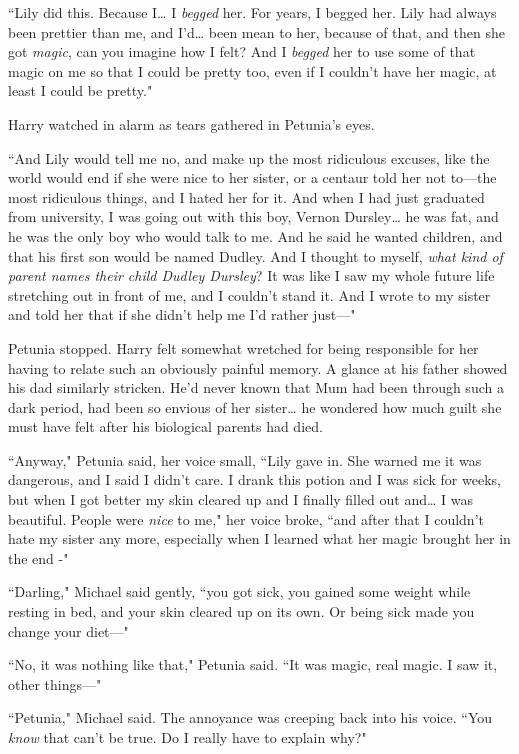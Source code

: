 ``Lily did this. Because I{\ldots} I \emph{begged} her. For years, I begged her. Lily had always been prettier than me, and I'd{\ldots} been mean to her, because of that, and then she got \emph{magic}, can you imagine how I felt? And I \emph{begged} her to use some of that magic on me so that I could be pretty too, even if I couldn't have her magic, at least I could be pretty."

Harry watched in alarm as tears gathered in Petunia's eyes.

``And Lily would tell me no, and make up the most ridiculous excuses, like the world would end if she were nice to her sister, or a centaur told her not to---the most ridiculous things, and I hated her for it. And when I had just graduated from university, I was going out with this boy, Vernon Dursley{\ldots} he was fat, and he was the only boy who would talk to me. And he said he wanted children, and that his first son would be named Dudley. And I thought to myself, \emph{what kind of parent names their child Dudley Dursley}? It was like I saw my whole future life stretching out in front of me, and I couldn't stand it. And I wrote to my sister and told her that if she didn't help me I'd rather just---"

Petunia stopped. Harry felt somewhat wretched for being responsible for her having to relate such an obviously painful memory. A glance at his father showed his dad similarly stricken. He'd never known that Mum had been through such a dark period, had been so envious of her sister{\ldots} he wondered how much guilt she must have felt after his biological parents had died.

``Anyway," Petunia said, her voice small, ``Lily gave in. She warned me it was dangerous, and I said I didn't care. I drank this potion and I was sick for weeks, but when I got better my skin cleared up and I finally filled out and{\ldots} I was beautiful. People were \emph{nice} to me," her voice broke, ``and after that I couldn't hate my sister any more, especially when I learned what her magic brought her in the end -"

``Darling," Michael said gently, ``you got sick, you gained some weight while resting in bed, and your skin cleared up on its own. Or being sick made you change your diet---"

``No, it was nothing like that," Petunia said. ``It was magic, real magic. I saw it, other things---"

``Petunia," Michael said. The annoyance was creeping back into his voice. ``You \emph{know} that can't be true. Do I really have to explain why?"


